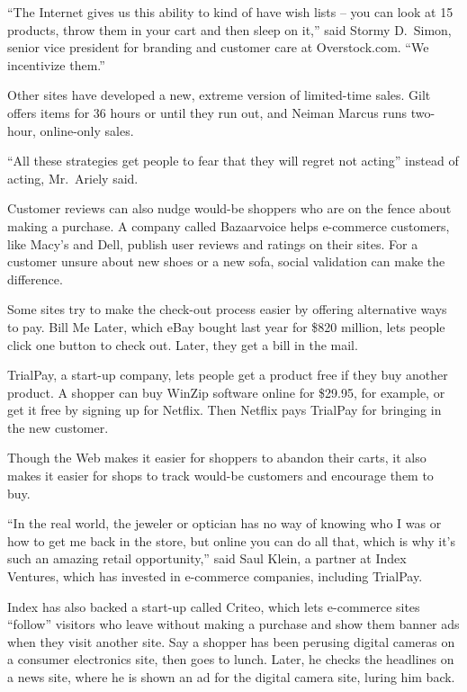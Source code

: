 ﻿\documentclass[12pt]{article}
\begin{document}
``The Internet gives us this ability to kind of have wish lists -- you can look at 15 products,
throw them in your cart and then sleep on it,'' said Stormy D.~Simon, senior vice president for
branding and customer care at Overstock.com. ``We incentivize them.''

Other sites have developed a new, extreme version of limited-time sales. Gilt offers items for 36
hours or until they run out, and Neiman Marcus runs two-hour, online-only sales.

``All these strategies get people to fear that they will regret not acting'' instead of acting,
Mr.~Ariely said.

Customer reviews can also nudge would-be shoppers who are on the fence about making a purchase. A
company called Bazaarvoice helps e-commerce customers, like Macy's and Dell, publish user reviews
and ratings on their sites. For a customer unsure about new shoes or a new sofa, social validation
can make the difference.

Some sites try to make the check-out process easier by offering alternative ways to pay. Bill Me
Later, which eBay bought last year for \$820 million, lets people click one button to check out.
Later, they get a bill in the mail.

TrialPay, a start-up company, lets people get a product free if they buy another product. A shopper
can buy WinZip software online for \$29.95, for example, or get it free by signing up for Netflix.
Then Netflix pays TrialPay for bringing in the new customer.

Though the Web makes it easier for shoppers to abandon their carts, it also makes it easier for
shops to track would-be customers and encourage them to buy.

``In the real world, the jeweler or optician has no way of knowing who I was or how to get me back
in the store, but online you can do all that, which is why it's such an amazing retail
opportunity,'' said Saul Klein, a partner at Index Ventures, which has invested in e-commerce
companies, including TrialPay.

Index has also backed a start-up called Criteo, which lets e-commerce sites ``follow'' visitors who
leave without making a purchase and show them banner ads when they visit another site. Say a shopper
has been perusing digital cameras on a consumer electronics site, then goes to lunch. Later, he
checks the headlines on a news site, where he is shown an ad for the digital camera site, luring him
back.
\end{document}
